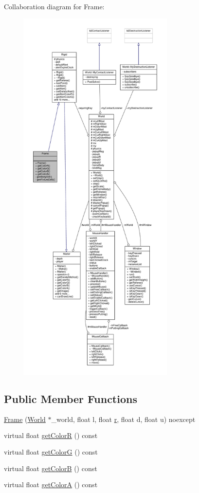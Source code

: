 Collaboration diagram for Frame\+:
\nopagebreak
\begin{figure}[H]
\begin{center}
\leavevmode
\includegraphics[height=550pt]{classFrame__coll__graph}
\end{center}
\end{figure}
\subsection*{Public Member Functions}
\begin{DoxyCompactItemize}
\item 
\hyperlink{classFrame_acfe3dc2087b63497a740317623e4d7ff}{Frame} (\hyperlink{classWorld}{World} $\ast$\+\_\+world, float l, float \hyperlink{image_8h_a62969232668331297e2dca1ae2ddd10d}{r}, float d, float u) noexcept
\item 
virtual float \hyperlink{classFrame_a1f5aa3b4dd7b90959a95c1e54f01a1e4}{get\+Color\+R} () const 
\item 
virtual float \hyperlink{classFrame_a44139c9e8bee6504c43bb6bc21b1d599}{get\+Color\+G} () const 
\item 
virtual float \hyperlink{classFrame_aac730f8f9ae5f59cb6a1814d56a8eefa}{get\+Color\+B} () const 
\item 
virtual float \hyperlink{classFrame_a99769eacd74a31fc9d198f83bc6616db}{get\+Color\+A} () const 
\end{DoxyCompactItemize}
